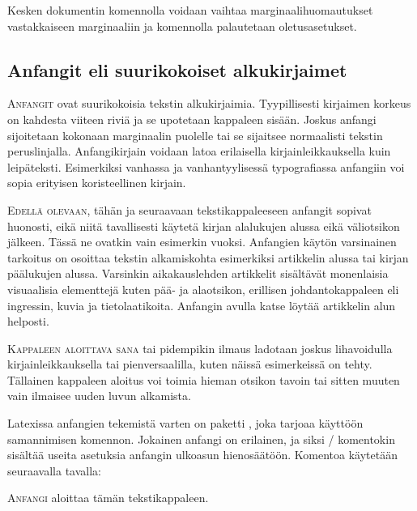 \noindent
Kesken dokumentin komennolla  voidaan vaihtaa
marginaalihuomautukset vastakkaiseen marginaaliin ja komennolla
 palautetaan oletusasetukset.

\subsection{Anfangit eli suurikokoiset alkukirjaimet}

\lettrine[lines=3, loversize=.06, lhang=.02, findent=-5bp, nindent=4bp,
slope=4bp]{A}{nfangit} ovat suurikokoisia tekstin alkukirjaimia.
Tyypillisesti kirjaimen korkeus on kahdesta viiteen riviä ja se
upotetaan kappaleen sisään. Joskus anfangi sijoitetaan kokonaan
marginaalin puolelle tai se sijaitsee normaalisti tekstin peruslinjalla.
Anfangikirjain voidaan latoa erilaisella kirjainleikkauksella kuin
leipäteksti. Esimerkiksi vanhassa ja vanhantyylisessä typografiassa
anfangiin voi sopia erityisen koristeellinen kirjain.

\medskip

\lettrine[lines=2, lhang=1, nindent=0bp]{E\hspace{1.5bp}}{dellä
  olevaan}, tähän ja seuraavaan tekstikappaleeseen anfangit sopivat
huonosti, eikä niitä tavallisesti käytetä kirjan alalukujen alussa eikä
väliotsikon jälkeen. Tässä ne ovatkin vain esimerkin vuoksi. Anfangien
käytön varsinainen tarkoitus on osoittaa tekstin alkamiskohta
esimerkiksi artikkelin alussa tai kirjan päälukujen alussa. Varsinkin
aikakauslehden artikkelit sisältävät monenlaisia visuaalisia elementtejä
kuten pää- ja alaotsikon, erillisen johdantokappaleen eli ingressin,
kuvia ja tietolaatikoita. Anfangin avulla katse löytää artikkelin alun
helposti.

\lettrine[lines=1, loversize=.1, lhang=.02, findent=1.5bp]{K}{appaleen
  aloittava sana} tai pidempikin ilmaus ladotaan joskus lihavoidulla
kirjainleikkauksella tai pienversaalilla, kuten näissä esimerkeissä on
tehty. Tällainen kappaleen aloitus voi toimia hieman otsikon tavoin tai
sitten muuten vain ilmaisee uuden luvun alkamista.

Latexissa anfangien tekemistä varten on paketti ,
joka tarjoaa käyttöön samannimisen komennon. Jokainen anfangi on
erilainen, ja siksi \-/ komentokin sisältää useita
asetuksia anfangin ulkoasun hienosäätöön. Komentoa käytetään seuraavalla
tavalla:

\begin{koodilohkosis}
\lettrine[lines=3, loversize=.06, lhang=.02, findent=-5bp,
  nindent=4bp, slope=4bp]{A}{nfangi} aloittaa tämän tekstikappaleen.
\end{koodilohkosis}

